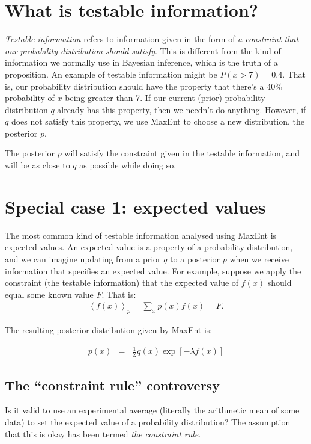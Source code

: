 \documentclass[a4paper, 11pt]{article}
\begin{document}
\section{What is testable information?}
{\it Testable information} refers to information given in the form of
{\it a constraint that our probability distribution should satisfy}. This is
different from the kind of information we normally use in Bayesian inference,
which is the truth of a proposition. An example of testable information
might be $P(x > 7) = 0.4$. That is, our probability distribution should have
the property that there's a 40\% probability of $x$ being greater than 7.
If our current (prior) probability distribution $q$ already has this property,
then we needn't do anything. However, if $q$ does not satisfy this property,
we use MaxEnt to choose a new distribution, the posterior $p$.

The posterior $p$ will satisfy the constraint given in the testable information,
and will be as close to $q$ as possible while doing so.



\section{Special case 1: expected values}\label{sec:expectations}
The most common kind of testable information analysed using MaxEnt is
expected values. An expected value is a property of a probability distribution,
and we can imagine updating from a prior $q$ to a posterior
$p$ when we receive information that specifies an expected value.
For example, suppose we apply the constraint (the testable information)
that the expected value of $f(x)$ should equal some known value $F$. That is:
\begin{eqnarray}
\left<f(x)\right>_p = \sum_x p(x)f(x) = F.
\end{eqnarray}

The resulting posterior distribution given by MaxEnt is:

\begin{eqnarray}
p(x) &=& \frac{1}{Z}q(x)\exp\left[-\lambda f(x)\right] 
\end{eqnarray}


\subsection{The ``constraint rule'' controversy}
Is it valid to use an experimental average (literally the arithmetic mean of
some data) to set the expected value of a probability distribution? The
assumption that this is okay has been termed {\it the constraint rule}.
\end{document}
